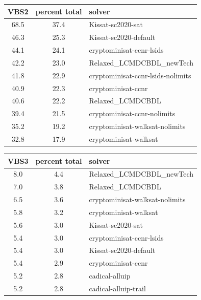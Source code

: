 \documentclass{elsarticle}
\begin{document}
\begin{table}
\begin{center}
\begin{tabular}{ccl}
\end{tabular}
\end{center}
\begin{center}
\begin{tabular}{ccl}
VBS2 & percent total & solver \\
\hline
68.5 & 37.4 & Kissat-sc2020-sat \\
46.3 & 25.3 & Kissat-sc2020-default \\
44.1 & 24.1 & cryptominisat-ccnr-lsids \\
42.2 & 23.0 & Relaxed\_LCMDCBDL\_newTech \\
41.8 & 22.9 & cryptominisat-ccnr-lsids-nolimits \\
40.9 & 22.3 & cryptominisat-ccnr \\
40.6 & 22.2 & Relaxed\_LCMDCBDL \\
39.4 & 21.5 & cryptominisat-ccnr-nolimits \\
35.2 & 19.2 & cryptominisat-walksat-nolimits \\
32.8 & 17.9 & cryptominisat-walksat \\
\end{tabular}
\end{center}
\begin{center}
\begin{tabular}{ccl}
VBS3 & percent total & solver \\
\hline
8.0 & 4.4 & Relaxed\_LCMDCBDL\_newTech \\
7.0 & 3.8 & Relaxed\_LCMDCBDL \\
6.5 & 3.6 & cryptominisat-walksat-nolimits \\
5.8 & 3.2 & cryptominisat-walksat \\
5.6 & 3.0 & Kissat-sc2020-sat \\
5.4 & 3.0 & cryptominisat-ccnr-lsids \\
5.4 & 3.0 & Kissat-sc2020-default \\
5.4 & 2.9 & cryptominisat-ccnr \\
5.2 & 2.8 & cadical-alluip \\
5.2 & 2.8 & cadical-alluip-trail \\
\end{tabular}
\end{center}
\end{table}
\end{document}
